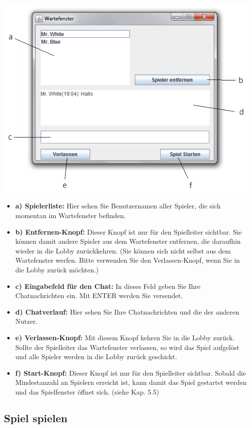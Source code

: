 \documentclass[titlepage,10pt,a4paper]{article}
\begin{document}
\includegraphics[width=\textwidth]{Warte-Fenster}
\begin{itemize}
	\item \textbf{a) Spielerliste:} Hier sehen Sie Benutzernamen aller Spieler, die sich momentan im \gls{Wartefenster} befinden.
	\item \textbf{b) Entfernen-Knopf:} Dieser Knopf ist nur für den Spielleiter sichtbar. Sie können damit andere Spieler aus dem \gls{Wartefenster} entfernen, die daraufhin wieder in die \gls{Lobby} zurückkehren. (Sie können sich nicht selbst aus dem \gls{Wartefenster} werfen. Bitte verwenden Sie den Verlassen-Knopf, wenn Sie in die \gls{Lobby} zurück möchten.)
	\item \textbf{c) Eingabefeld für den Chat:} In dieses Feld geben Sie Ihre Chatnachrichten ein. Mit ENTER werden Sie versendet.
	\item \textbf{d) Chatverlauf:} Hier sehen Sie Ihre Chatnachrichten und die der anderen Nutzer.
	\item \textbf{e) Verlassen-Knopf:} Mit diesem Knopf kehren Sie in die \gls{Lobby} zurück. Sollte der \gls{Spielleiter} das \gls{Wartefenster} verlassen, so wird das Spiel aufgelöst und alle Spieler werden in die Lobby zurück geschickt.
	\item \textbf{f) Start-Knopf:} Dieser Knopf ist nur für den \gls{Spielleiter} sichtbar. Sobald die Mindestanzahl an Spielern erreicht ist, kann damit das Spiel gestartet werden und das Spielfenster öffnet sich. (siehe Kap. 5.5)
\end{itemize}

\subsection{Spiel spielen}
\end{document}

